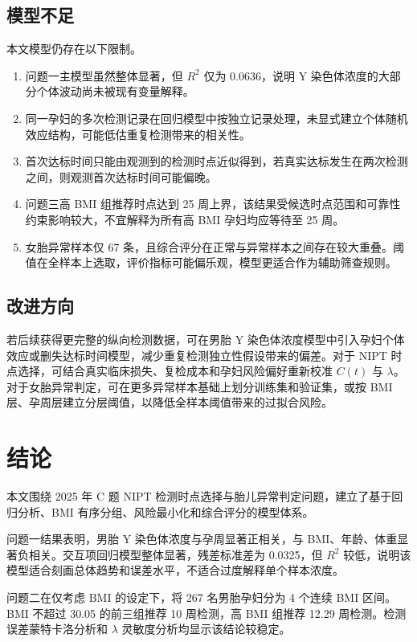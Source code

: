 \documentclass[UTF8,zihao=-4]{ctexart}
\numberwithin{equation}{section}
\begin{document}
\subsection{模型不足}

本文模型仍存在以下限制。
\begin{enumerate}
  \item 问题一主模型虽然整体显著，但 $R^2$ 仅为 0.0636，说明 Y 染色体浓度的大部分个体波动尚未被现有变量解释。
  \item 同一孕妇的多次检测记录在回归模型中按独立记录处理，未显式建立个体随机效应结构，可能低估重复检测带来的相关性。
  \item 首次达标时间只能由观测到的检测时点近似得到，若真实达标发生在两次检测之间，则观测首次达标时间可能偏晚。
  \item 问题三高 BMI 组推荐时点达到 25 周上界，该结果受候选时点范围和可靠性约束影响较大，不宜解释为所有高 BMI 孕妇均应等待至 25 周。
  \item 女胎异常样本仅 67 条，且综合评分在正常与异常样本之间存在较大重叠。阈值在全样本上选取，评价指标可能偏乐观，模型更适合作为辅助筛查规则。
\end{enumerate}

\subsection{改进方向}

若后续获得更完整的纵向检测数据，可在男胎 Y 染色体浓度模型中引入孕妇个体效应或删失达标时间模型，减少重复检测独立性假设带来的偏差。对于 NIPT 时点选择，可结合真实临床损失、复检成本和孕妇风险偏好重新校准 $C(t)$ 与 $\lambda$。对于女胎异常判定，可在更多异常样本基础上划分训练集和验证集，或按 BMI 层、孕周层建立分层阈值，以降低全样本阈值带来的过拟合风险。

\section{结论}

本文围绕 2025 年 C 题 NIPT 检测时点选择与胎儿异常判定问题，建立了基于回归分析、BMI 有序分组、风险最小化和综合评分的模型体系。

问题一结果表明，男胎 Y 染色体浓度与孕周显著正相关，与 BMI、年龄、体重显著负相关。交互项回归模型整体显著，残差标准差为 0.0325，但 $R^2$ 较低，说明该模型适合刻画总体趋势和误差水平，不适合过度解释单个样本浓度。

问题二在仅考虑 BMI 的设定下，将 267 名男胎孕妇分为 4 个连续 BMI 区间。BMI 不超过 30.05 的前三组推荐 10 周检测，高 BMI 组推荐 12.29 周检测。检测误差蒙特卡洛分析和 $\lambda$ 灵敏度分析均显示该结论较稳定。
\end{document}
